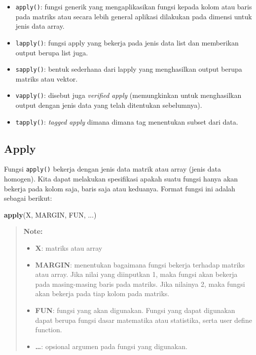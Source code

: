 \documentclass[]{book}
\newenvironment{Shaded}{\begin{snugshade}}{\end{snugshade}}
\newcommand{\KeywordTok}[1]{\textcolor[rgb]{0.13,0.29,0.53}{\textbf{#1}}}
\newcommand{\NormalTok}[1]{#1}
\providecommand{\tightlist}{%
  \setlength{\itemsep}{0pt}\setlength{\parskip}{0pt}}
\begin{document}
\begin{itemize}
\tightlist
\item
  \texttt{apply()}: fungsi generik yang mengaplikasikan fungsi kepada
  kolom atau baris pada matriks atau secara lebih general aplikasi
  dilakukan pada dimensi untuk jenis data array.
\item
  \texttt{lapply()}: fungsi apply yang bekerja pada jenis data list dan
  memberikan output berupa list juga.
\item
  \texttt{sapply()}: bentuk sederhana dari lapply yang menghasilkan
  output berupa matriks atau vektor.
\item
  \texttt{vapply()}: disebut juga \emph{verified apply} (memungkinkan
  untuk menghasilkan output dengan jenis data yang telah ditentukan
  sebelumnya).
\item
  \texttt{tapply()}: \emph{tagged apply} dimana dimana tag menentukan
  subset dari data.
\end{itemize}

\subsection{Apply}\label{apply}

Fungsi \texttt{apply()} bekerja dengan jenis data matrik atau array
(jenis data homogen). Kita dapat melakukan spesifikasi apakah suatu
fungsi hanya akan bekerja pada kolom saja, baris saja atau keduanya.
Format fungsi ini adalah sebagai berikut:

\begin{Shaded}
\begin{Highlighting}[]
\KeywordTok{apply}\NormalTok{(X, MARGIN, FUN, ...)}
\end{Highlighting}
\end{Shaded}

\begin{quote}
\textbf{Note: }

\begin{itemize}
\tightlist
\item
  \textbf{X}: matriks atau array
\item
  \textbf{MARGIN}: menentukan bagaimana fungsi bekerja terhadap matriks
  atau array. Jika nilai yang diinputkan 1, maka fungsi akan bekerja
  pada masing-masing baris pada matriks. Jika nilainya 2, maka fungsi
  akan bekerja pada tiap kolom pada matriks.
\item
  \textbf{FUN}: fungsi yang akan digunakan. Fungsi yang dapat digunakan
  dapat berupa fungsi dasar matematika atau statistika, serta user
  define function.
\item
  \textbf{\ldots{}}: opsional argumen pada fungsi yang digunakan.
\end{itemize}
\end{quote}
\end{document}
